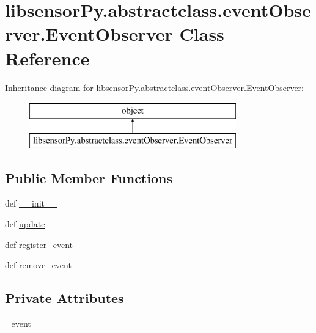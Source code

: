 \hypertarget{classlibsensorPy_1_1abstractclass_1_1eventObserver_1_1EventObserver}{}\section{libsensor\+Py.\+abstractclass.\+event\+Observer.\+Event\+Observer Class Reference}
\label{classlibsensorPy_1_1abstractclass_1_1eventObserver_1_1EventObserver}
Inheritance diagram for libsensor\+Py.\+abstractclass.\+event\+Observer.\+Event\+Observer\+:\begin{figure}[H]
\begin{center}
\leavevmode
\includegraphics[height=2.000000cm]{classlibsensorPy_1_1abstractclass_1_1eventObserver_1_1EventObserver}
\end{center}
\end{figure}
\subsection*{Public Member Functions}
\begin{DoxyCompactItemize}
\item 
def \hyperlink{classlibsensorPy_1_1abstractclass_1_1eventObserver_1_1EventObserver_a8b691131dbdb89607b4fc92897413dbf}{\+\_\+\+\_\+init\+\_\+\+\_\+}
\item 
def \hyperlink{classlibsensorPy_1_1abstractclass_1_1eventObserver_1_1EventObserver_ae9cd257e8fa766017153fa1d2450dedb}{update}
\item 
def \hyperlink{classlibsensorPy_1_1abstractclass_1_1eventObserver_1_1EventObserver_a12f9d68feb590956846f3b662f76d497}{register\+\_\+event}
\item 
def \hyperlink{classlibsensorPy_1_1abstractclass_1_1eventObserver_1_1EventObserver_ad718513412d1f0c84631273f00292b28}{remove\+\_\+event}
\end{DoxyCompactItemize}
\subsection*{Private Attributes}
\begin{DoxyCompactItemize}
\item 
\hyperlink{classlibsensorPy_1_1abstractclass_1_1eventObserver_1_1EventObserver_a7a1e08b9e92cec21bf6f7e60ac863d40}{\+\_\+event}
\end{DoxyCompactItemize}
